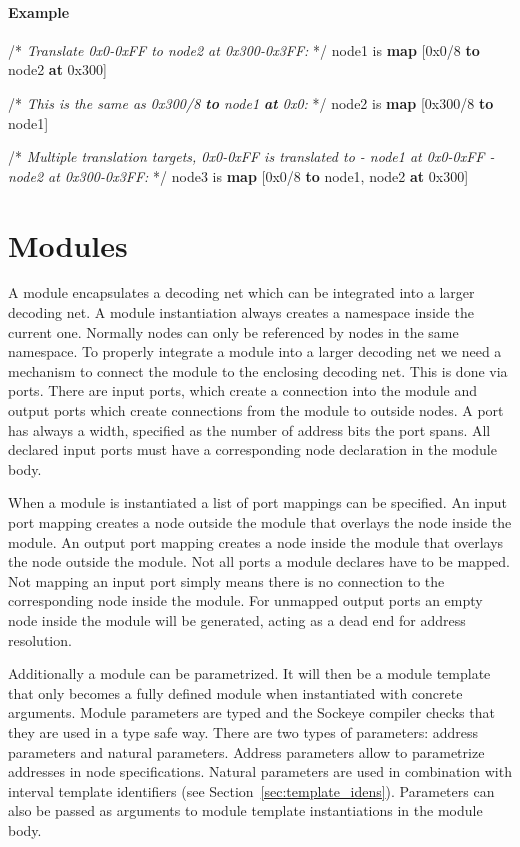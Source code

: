 \documentclass[a4paper,11pt,twoside]{report}
\begin{document}
{{{\paragraph{Example}
\begin{syntax}
    /* \textit{Translate \textup{0x0-0xFF} to \textup{node2} at \textup{0x300-0x3FF}:} */
    node1 is \textbf{map} [0x0/8 \textbf{to} node2 \textbf{at} 0x300] 

    /* \textit{This is the same as \textup{0x300/8 \textbf{to} node1 \textbf{at} 0x0}:} */
    node2 is \textbf{map} [0x300/8 \textbf{to} node1]

    /* \textit{Multiple translation targets, \textup{0x0-0xFF} is translated to
       - \textup{node1} at \textup{0x0-0xFF}
       - \textup{node2} at \textup{0x300-0x3FF}:} */
    node3 is \textbf{map} [0x0/8 \textbf{to} node1, node2 \textbf{at} 0x300]
\end{syntax}

\section{Modules}
\label{sec:modules}
A module encapsulates a decoding net which can be integrated into a larger decoding net.
A module instantiation always creates a namespace inside the current one.
Normally nodes can only be referenced by nodes in the same namespace.
To properly integrate a module into a larger decoding net we need a mechanism to connect the module to the enclosing decoding net.
This is done via ports.
There are input ports, which create a connection into the module and output ports which create connections from the module to outside nodes.
A port has always a width, specified as the number of address bits the port spans.
All declared input ports must have a corresponding node declaration in the module body.

When a module is instantiated a list of port mappings can be specified.
An input port mapping creates a node outside the module that overlays the node inside the module.
An output port mapping creates a node inside the module that overlays the node outside the module.
Not all ports a module declares have to be mapped.
Not mapping an input port simply means there is no connection to the corresponding node inside the module.
For unmapped output ports an empty node inside the module will be generated, acting as a dead end for address resolution.

Additionally a module can be parametrized.
It will then be a module template that only becomes a fully defined module when instantiated with concrete arguments.
Module parameters are typed and the Sockeye compiler checks that they are used in a type safe way.
There are two types of parameters: address parameters and natural parameters.
Address parameters allow to parametrize addresses in node specifications.
Natural parameters are used in combination with interval template identifiers (see Section~\ref{sec:template_idens}).
Parameters can also be passed as arguments to module template instantiations in the module body.

}}}
\end{document}
